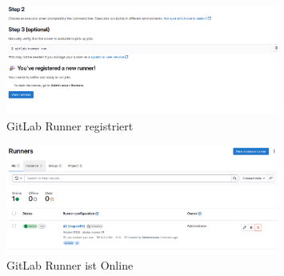 \documentclass[a4paper,12pt]{article}
\begin{document}
\begin{figure}[H]
	\centering
	\includegraphics[width=0.8\textwidth]{data/RUNNER_GEHT.png}
	\caption{GitLab Runner registriert}
	\label{fig:GitLab Runner registriert}
\end{figure}
\begin{figure}[H]
	\centering
	\includegraphics[width=0.8\textwidth]{data/RUNNER_ONLINE.png}
	\caption{GitLab Runner ist Online}
	\label{fig:GitLab Runner ist Online}
\end{figure}


\newpage
{}
\listoffigures
\newpage
{}
\listoftables
\end{document}
